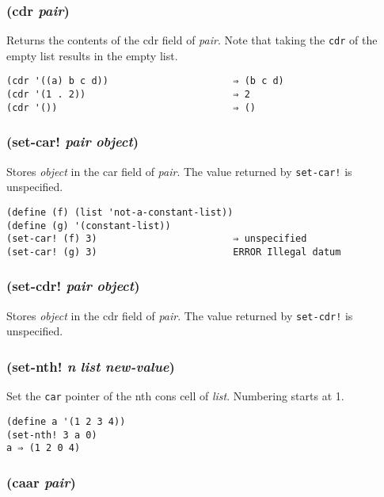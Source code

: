 \documentclass{article}
\begin{document}
\subsubsection{(cdr \emph{pair})}

Returns the contents of the cdr field of \emph{pair}. Note that taking the \verb|cdr| of the
empty list results in the empty list.

\begin{verbatim}
(cdr '((a) b c d))                      ⇒ (b c d)
(cdr '(1 . 2))                          ⇒ 2
(cdr '())                               ⇒ ()
\end{verbatim}

\subsubsection{(set-car! \emph{pair} \emph{object})}

Stores \emph{object} in the car field of \emph{pair}. The value returned by \verb|set-car!|
is unspecified.

\begin{verbatim}
(define (f) (list 'not-a-constant-list))
(define (g) '(constant-list))
(set-car! (f) 3)                        ⇒ unspecified
(set-car! (g) 3)                        ERROR Illegal datum
\end{verbatim}

\subsubsection{(set-cdr! \emph{pair} \emph{object})}

Stores \emph{object} in the cdr field of \emph{pair}. The value returned by \verb|set-cdr!|
is unspecified.

\subsubsection{(set-nth! \emph{n} \emph{list} \emph{new-value})}

Set the \verb|car| pointer of the nth cons cell of \emph{list}. Numbering starts at 1.

\begin{verbatim}
(define a '(1 2 3 4))
(set-nth! 3 a 0)
a ⇒ (1 2 0 4)
\end{verbatim}

\subsubsection{(caar \emph{pair})}
\end{document}

